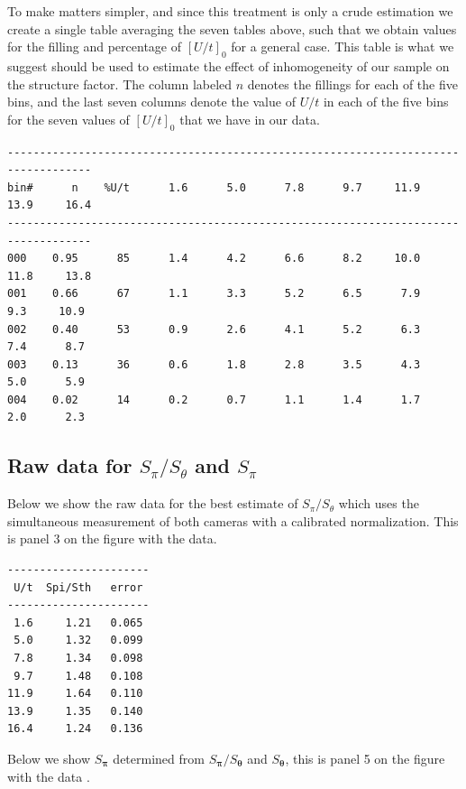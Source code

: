 \documentclass[11pt,letter]{article}
\newcommand{\bv}[1]{\ensuremath{\bm{#1}}}
\begin{document}
To make matters simpler, and since this treatment is only a crude estimation we
create a single table averaging the seven tables above,  such that we obtain
values for the filling and percentage of $[U/t]_{0}$ for a general case.   This
table is what we suggest should be used to estimate the effect of inhomogeneity
of our sample on the structure factor.   The column labeled $n$ denotes the
fillings for each of the five bins,  and the last seven columns denote the
value of $U/t$ in each of the five bins for the seven values of $[U/t]_{0}$
that we have in our data. 

\begin{verbatim}
-----------------------------------------------------------------------------------
bin#      n    %U/t      1.6      5.0      7.8      9.7     11.9     13.9     16.4 
-----------------------------------------------------------------------------------
000    0.95      85      1.4      4.2      6.6      8.2     10.0     11.8     13.8
001    0.66      67      1.1      3.3      5.2      6.5      7.9      9.3     10.9
002    0.40      53      0.9      2.6      4.1      5.2      6.3      7.4      8.7
003    0.13      36      0.6      1.8      2.8      3.5      4.3      5.0      5.9
004    0.02      14      0.2      0.7      1.1      1.4      1.7      2.0      2.3
\end{verbatim}

\subsection{Raw data for $S_{\pi}/S_{\theta}$ and $S_{\pi}$ }

Below we show the raw data for the best estimate of $S_{\pi}/S_{\theta}$ which uses the simultaneous measurement of both cameras with a calibrated normalization.  This is panel 3 on the figure with the data. 

\begin{verbatim}
----------------------
 U/t  Spi/Sth   error
----------------------
 1.6     1.21   0.065
 5.0     1.32   0.099
 7.8     1.34   0.098
 9.7     1.48   0.108
11.9     1.64   0.110
13.9     1.35   0.140
16.4     1.24   0.136
\end{verbatim}

\vspace{2em}

Below we show $S_{\bv{\pi}}$ determined from $S_{\bv{\pi}}/S_{\bv{\theta}}$ and $S_{\bv{\theta}}$, this is panel 5 on the figure with the data .
\end{document}
